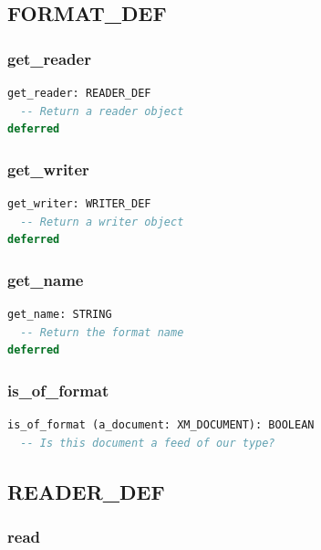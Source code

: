 \subsection{FORMAT\_DEF}
\label{sec:formats-format-def}

\subsubsection{get\_reader}

\begin{lstlisting}[language=Eiffel]
get_reader: READER_DEF
  -- Return a reader object
deferred
\end{lstlisting}

\subsubsection{get\_writer}

\begin{lstlisting}[language=Eiffel]
get_writer: WRITER_DEF
  -- Return a writer object
deferred
\end{lstlisting}

\subsubsection{get\_name}

\begin{lstlisting}[language=Eiffel]
get_name: STRING
  -- Return the format name
deferred
\end{lstlisting}

\subsubsection{is\_of\_format}

\begin{lstlisting}[language=Eiffel]
is_of_format (a_document: XM_DOCUMENT): BOOLEAN
  -- Is this document a feed of our type?
\end{lstlisting}


\subsection{READER\_DEF}
\label{sec:formats-reader-def}

\subsubsection{read}

